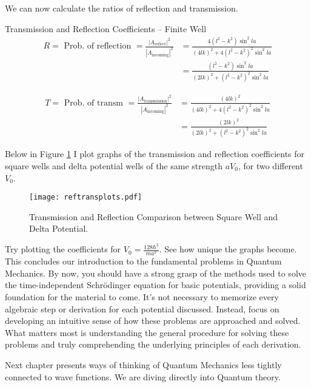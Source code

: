 We can now calculate the ratios of reflection and transmission. 

\begin{mainbox}{Transmission and Reflection Coefficients -- Finite Well}
  \begin{align} 
    R = \text{ Prob. of reflection } = \frac{|A_\text{reflect}
    |^2}{|A_\text{incoming} |^2} &= \frac{4(l^2 - k^2)\sin^2 la}{(4lk)^2 + 4(l^2
    -k^2)^2 \sin^2 la} \\ &= \frac{(l^2 - k^2) \sin^2 la}{(2lk)^2 + (l^2 - k^2)^2
    \sin^2 la}
  \end{align}

  \begin{align} \label{}
    T = \text{ Prob. of transm } = \frac{|A_\text{transmission}
    |^2}{|A_\text{incoming} |^2} &= \frac{(4lk)^2}{(4lk)^2 + 4(l^2 - k^2)^2
    \sin^2 la} \\ &= \frac{(2lk)^2}{(2lk)^2 + (l^2 - k^2)^2 \sin^2 la}
  \end{align}\vspace{3px}
\end{mainbox}

Below in Figure \ref{reftransplots} I plot graphs of the transmission and
reflection coefficients for square wells and delta potential wells of the same
strength $aV_0$, for two different $V_0$. 

\begin{figure}[H]
  \centering
    \texttt{[image: reftransplots.pdf]}
    \caption{Transmission and Reflection Comparison between Square Well and
    Delta Potential.}
    \label{reftransplots}
\end{figure}

Try plotting the coefficients for $V_0 = \frac{128\hbar^2}{ma^2}$. See how
unique the graphs become. \\ 


This concludes our introduction to the fundamental problems in Quantum
Mechanics. By now, you should have a strong grasp of the methods used to solve
the time-independent Schrödinger equation for basic potentials, providing
a solid foundation for the material to come. It's not necessary to memorize
every algebraic step or derivation for each potential discussed. Instead, focus
on developing an intuitive sense of how these problems are approached and
solved. What matters most is understanding the general procedure for solving
these problems and truly comprehending the underlying principles of each
derivation. 

Next chapter presents ways of thinking of
Quantum Mechanics less tightly connected to wave functions. We are diving
directly into Quantum theory. 
